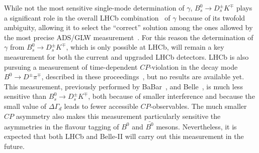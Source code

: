 While not the most sensitive single-mode determination of $\gamma$, $B^0_s \to D^\pm_s K^\mp$ plays a significant
role in the overall LHCb combination~\cite{LHCb-PAPER-2016-032} of $\gamma$ because of its twofold ambiguity, allowing it to select the ``correct''
solution among the ones allowed by the most precise ADS/GLW measurement~\cite{LHCb-PAPER-2016-003}. For this reason the determination
of $\gamma$ from $B^0_s \to D^\pm_s K^\mp$, which is only possible at LHCb, will remain a key measurement for both the current
and upgraded LHCb detectors. LHCb is also pursuing a measurement of time-dependent $CP$-violation in
the decay mode $B^0 \to D^\pm \pi^\mp$, described in these proceedings~\cite{BDPIPROC}, but no results are available yet.
This measurement, previously performed by BaBar~\cite{Aubert:2005yf}, \cite{Aubert:2006tw} and Belle~\cite{Bahinipati:2011yq}, \cite{Ronga:2006hv}
is much less sensitive than $B^0_s \to D^\pm_s K^\mp$, both because of smaller interference and because
the small value of $\Delta\Gamma_d$ leads to fewer accessible $CP$-observables. The much smaller $CP$ asymmetry
also makes this measurement particularly sensitive the asymmetries in the flavour tagging of $B^0$ and $\bar{B^0}$ mesons.
Nevertheless, it is expected that both LHCb and Belle-II will carry out this measurement in the future.
